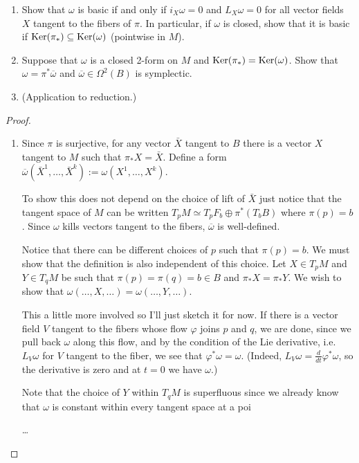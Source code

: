 \begin{exercise}
\label{exercise-basic-forms-characterization}
\begin{enumerate}
\item Show that $\omega$ is basic if and only
if
$i_X \omega=0$ and $L_X\omega=0$
for all vector fields $X$ tangent
to the fibers of $\pi$.
In particular, if $\omega$ is closed,
show that it is basic if
$\mathop{\mathrm{Ker}} (\pi_*) \subseteq \mathop{\mathrm{Ker}}(\omega)$
(pointwise in $M$).

\item Suppose that $\omega$ is a closed
2-form on $M$ and $\mathop{\mathrm{Ker}}(\pi_*)=\mathop{\mathrm{Ker}}(\omega)$.
Show that $\omega=\pi^*\overline{\omega}$
and $\overline{\omega}\in\Omega^2(B)$
is symplectic.

\item (Application to reduction.)
\end{enumerate}
\end{exercise}

\begin{proof}
\begin{enumerate}
\item Since $\pi$ is surjective, for any
vector $\bar{X}$ tangent to $B$ there is
a vector $X$ tangent to $M$ such that
$\pi_*X=\bar{X}$.
Define a form
$\overline{\omega}(\bar{X}^1,…,\bar{X}^k):=
\omega(X^1,…,X^k)$.

To show this does not depend on the choice of
lift of $\bar{X}$
just notice that the tangent space of $M$ can
be written
$T_pM \simeq T_pF_b \oplus \pi^*(T_bB)$ where
$\pi(p)=b$.
Since $\omega$ kills vectors tangent to the
fibers,
$\overline{\omega}$ is well-defined.

Notice that there can be different choices of
$p$ such that
$\pi(p)=b$. We must show that the definition
is also
independent of this choice.
Let $X \in T_pM$ and $Y \in T_qM$ be such
that
$\pi(p)=\pi(q)=b \in B$ and $\pi_*X=\pi_*Y$.
We wish to show that
$\omega(…,X,…)=\omega(…,Y,…)$.

This a little more involved so I'll just
sketch it for now.
If there is a vector field $V$ tangent to the
fibers
whose flow $\varphi$ joins $p$ and $q$, we
are done,
since we pull back $\omega$ along this flow,
and by the condition of the Lie derivative,
i.e. $L_V\omega$ for $V$
tangent to the fiber, we see that
$\varphi^*\omega=\omega$.
(Indeed,
$L_V\omega=\frac{d}{dt}\varphi^*\omega$,
so the derivative is zero and at $t=0$ we
have $\omega$.)

Note that the choice of $Y$ within $T_qM$
is superfluous since we already know that
$\omega$
is constant within every tangent space at a
poi

…
\end{enumerate}
\end{proof}




